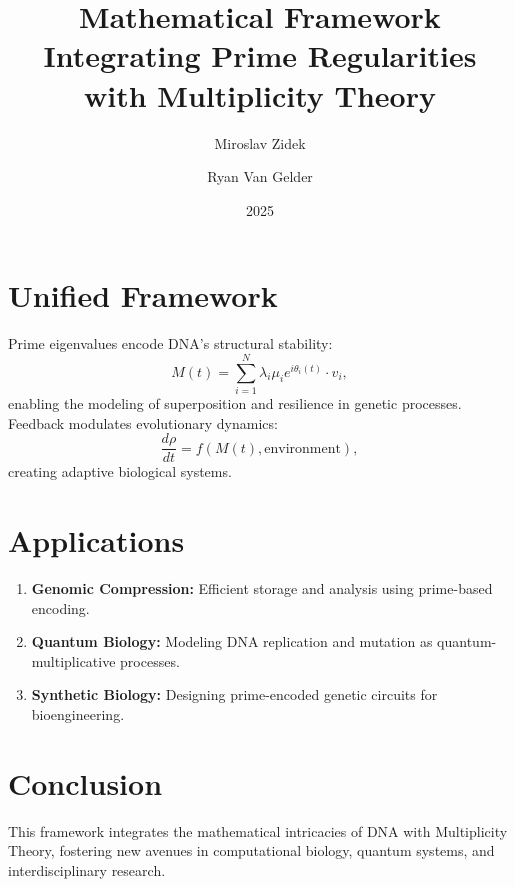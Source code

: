 \documentclass[11pt]{article}
\begin{document}
\section{Unified Framework}
Prime eigenvalues encode DNA’s structural stability:
\begin{equation}
    M(t) = \sum_{i=1}^N \lambda_i \mu_i e^{i\theta_i(t)} \cdot v_i,
\end{equation}
enabling the modeling of superposition and resilience in genetic processes. Feedback modulates evolutionary dynamics:
\begin{equation}
    \frac{d\rho}{dt} = f(M(t), \text{environment}),
\end{equation}
creating adaptive biological systems.

\section{Applications}
\begin{enumerate}
    \item \textbf{Genomic Compression:} Efficient storage and analysis using prime-based encoding.
    \item \textbf{Quantum Biology:} Modeling DNA replication and mutation as quantum-multiplicative processes.
    \item \textbf{Synthetic Biology:} Designing prime-encoded genetic circuits for bioengineering.
\end{enumerate}

\section{Conclusion}
This framework integrates the mathematical intricacies of DNA with Multiplicity Theory, fostering new avenues in computational biology, quantum systems, and interdisciplinary research.
\title{Mathematical Framework Integrating Prime Regularities with Multiplicity Theory}
\author[1]{Miroslav Zidek}
\author[2]{Ryan Van Gelder}
\date{2025}
\end{document}

